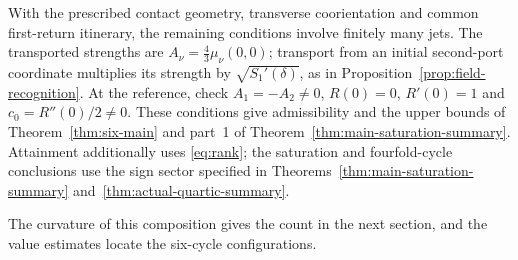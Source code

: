 \begin{remark}\label{cor:field-criterion}
With the prescribed contact geometry, transverse coorientation and
common first-return itinerary, the remaining conditions involve finitely
many jets. The transported strengths are $A_\nu=\tfrac43\mu_\nu(0,0)$;
transport from an initial second-port coordinate multiplies its strength by
$\sqrt{S_1'(\delta)}$, as in Proposition~\ref{prop:field-recognition}.
At the reference, check $A_1=-A_2\ne0$, $R(0)=0$, $R'(0)=1$ and
$c_0=R''(0)/2\ne0$. These conditions give admissibility and the upper
bounds of Theorem~\ref{thm:six-main} and part~1 of
Theorem~\ref{thm:main-saturation-summary}. Attainment additionally uses
\eqref{eq:rank}; the saturation and fourfold-cycle conclusions use the
sign sector specified in Theorems~\ref{thm:main-saturation-summary}
and~\ref{thm:actual-quartic-summary}.
\end{remark}

The curvature of this composition gives the count in the next section, and
the value estimates locate the six-cycle configurations.
